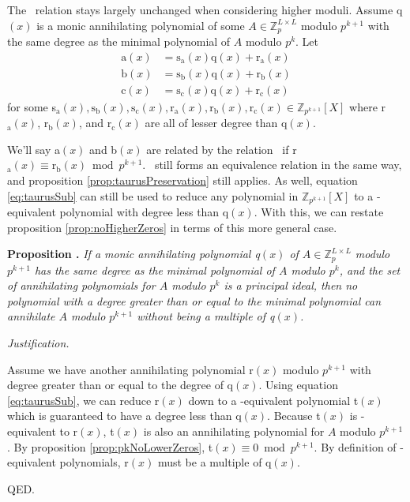 \documentclass[a4paper, 12pt, reqno]{amsart}
\newcounter{propcounter}
\newenvironment{proposition}[1]
{
	\vspace{1em}
	\refstepcounter{propcounter} %
	\textbf{Proposition \thepropcounter.} \emph{#1}
	
	\emph{Justification.}
}
{
	QED. \\
}
\begin{document}
		The \Taurus\ relation stays largely unchanged when considering higher moduli. Assume q$(x)$ is a monic annihilating polynomial of some 
		$A \in \mathds{Z}_{p}^{L \times L}$ modulo $p^{k+1}$ with the same degree as the minimal polynomial of $A$ modulo $p^k$. Let 
		\begin{align*}
			\text{a}(x) &= \text{s}_\text{a}(x)\text{q}(x) + \text{r}_\text{a}(x) \\
			\text{b}(x) &= \text{s}_\text{b}(x)\text{q}(x) + \text{r}_\text{b}(x) \\
			\text{c}(x) &= \text{s}_\text{c}(x)\text{q}(x) + \text{r}_\text{c}(x)
		\end{align*}
		for some 
		s$_\text{a}(x), \text{s}_\text{b}(x), \text{s}_\text{c}(x), \text{r}_\text{a}(x), \text{r}_\text{b}(x), \text{r}_\text{c}(x) \in \mathds{Z}_{p^{k+1}}[X]$ where
		r$_\text{a}(x)$, r$_\text{b}(x)$, and r$_\text{c}(x)$ are all of lesser degree than q$(x)$. 
		
		We'll say a$(x)$ and b$(x)$ are related by the relation \Taurus\ if r$_\text{a}(x) \equiv \text{r}_\text{b}(x) \bmod{p^{k+1}}$. \Taurus\ still forms an equivalence
		relation in the same way, and proposition \ref{prop:taurusPreservation} still applies. As well, equation \ref{eq:taurusSub} can still be used to reduce any
		polynomial in $\mathds{Z}_{p^{k+1}}[X]$ to a \Taurus-equivalent polynomial with degree less than q$(x)$. With this, we can restate proposition 
		\ref{prop:noHigherZeros} in terms of this more general case.
		
		\begin{proposition}{If a monic annihilating polynomial q$(x)$ of $A \in \mathds{Z}_{p}^{L \times L}$ modulo $p^{k+1}$ has the same degree as the minimal polynomial 
		of $A$ modulo $p^k$, and the set of annihilating polynomials for $A$ modulo $p^k$ is a principal ideal, then no polynomial with a degree greater than or equal to 
		the minimal polynomial can annihilate $A$ modulo $p^{k+1}$ without being a multiple of q$(x)$.}
			\label{prop:pkNoHigherZeros}
			Assume we have another annihilating polynomial r$(x)$ modulo $p^{k+1}$ with degree greater than or equal to the degree of q$(x)$. Using equation 
			\ref{eq:taurusSub}, we can reduce r$(x)$ down to a \Taurus-equivalent polynomial t$(x)$ which is guaranteed to have a degree less than q$(x)$. Because t$(x)$ is
			\Taurus-equivalent to r$(x)$, t$(x)$ is also an annihilating polynomial for $A$ modulo $p^{k+1}$. By proposition \ref{prop:pkNoLowerZeros}, 
			t$(x) \equiv 0 \bmod{p^{k+1}}$. By definition of \Taurus-equivalent polynomials, r$(x)$ must be a multiple of q$(x)$.
		\end{proposition}
		
\end{document}
